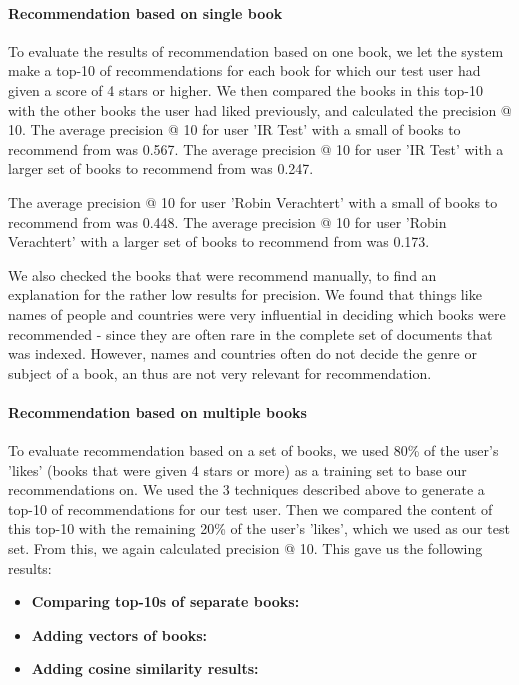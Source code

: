 \documentclass[10pt,a4paper]{paper}
\begin{document}
\paragraph{Recommendation based on single book}
To evaluate the results of recommendation based on one book, we let the system make a top-10 of recommendations for each book for which our test user had given a score of 4 stars or higher. We then compared the books in this top-10 with the other books the user had liked previously, and calculated the precision @ 10.
The average precision @ 10 for user 'IR Test' with a small of books to recommend from was 0.567. 
The average precision @ 10 for user 'IR Test' with a larger set of books to recommend from was 0.247.

The average precision @ 10 for user 'Robin Verachtert' with a small of books to recommend from was 0.448. 
The average precision @ 10 for user 'Robin Verachtert' with a larger set of books to recommend from was 0.173.

We also checked the books that were recommend manually, to find an explanation for the rather low results for precision. We found that things like names of people and countries were very influential in deciding which books were recommended - since they are often rare in the complete set of documents that was indexed. However, names and countries often do not decide the genre or subject of a book, an thus are not very relevant for recommendation. 

\paragraph{Recommendation based on multiple books}
To evaluate recommendation based on a set of books, we used 80\% of the user's 'likes' (books that were given 4 stars or more) as a training set to base our recommendations on. We used the 3 techniques described above to generate a top-10 of recommendations for our test user. Then we compared the content of this top-10 with the remaining 20\% of the user's 'likes', which we used as our test set.
From this, we again calculated precision @ 10.
This gave us the following results:
\begin{itemize}
\item \textbf{Comparing top-10s of separate books:} %
\item \textbf{Adding vectors of books:}
\item \textbf{Adding cosine similarity results:}
\end{itemize}
\end{document}
